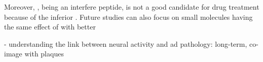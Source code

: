 Moreover, \tglu, being an interfere peptide, is not a good candidate for drug treatment because of the inferior . Future studies can also focus on small molecules having the same effect of \tglu with better 

- understanding the link between neural activity and ad pathology:
    long-term, co-image with plaques







